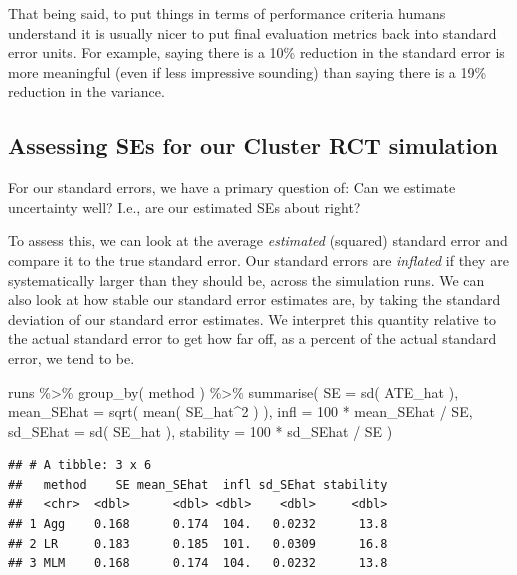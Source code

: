 \documentclass[
]{book}
\newenvironment{Shaded}{\begin{snugshade}}{\end{snugshade}}
\newcommand{\AttributeTok}[1]{\textcolor[rgb]{0.77,0.63,0.00}{#1}}
\newcommand{\DecValTok}[1]{\textcolor[rgb]{0.00,0.00,0.81}{#1}}
\newcommand{\FunctionTok}[1]{\textcolor[rgb]{0.00,0.00,0.00}{#1}}
\newcommand{\NormalTok}[1]{#1}
\newcommand{\SpecialCharTok}[1]{\textcolor[rgb]{0.00,0.00,0.00}{#1}}
\begin{document}
That being said, to put things in terms of performance criteria humans understand it is usually nicer to put final evaluation metrics back into standard error units.
For example, saying there is a 10\% reduction in the standard error is more meaningful (even if less impressive sounding) than saying there is a 19\% reduction in the variance.

\hypertarget{assessing-ses-for-our-cluster-rct-simulation}{%
\subsection{Assessing SEs for our Cluster RCT simulation}\label{assessing-ses-for-our-cluster-rct-simulation}}

For our standard errors, we have a primary question of: Can we estimate uncertainty well? I.e., are our estimated SEs about right?

To assess this, we can look at the average \emph{estimated} (squared) standard error and compare it to the true standard error.
Our standard errors are \emph{inflated} if they are systematically larger than they should be, across the simulation runs.
We can also look at how stable our standard error estimates are, by taking the standard deviation of our standard error estimates.
We interpret this quantity relative to the actual standard error to get how far off, as a percent of the actual standard error, we tend to be.

\begin{Shaded}
\begin{Highlighting}[]
\NormalTok{runs }\SpecialCharTok{\%\textgreater{}\%}  \FunctionTok{group\_by}\NormalTok{( method ) }\SpecialCharTok{\%\textgreater{}\%}
  \FunctionTok{summarise}\NormalTok{( }
    \AttributeTok{SE =} \FunctionTok{sd}\NormalTok{( ATE\_hat ),}
    \AttributeTok{mean\_SEhat =} \FunctionTok{sqrt}\NormalTok{( }\FunctionTok{mean}\NormalTok{( SE\_hat}\SpecialCharTok{\^{}}\DecValTok{2}\NormalTok{ ) ),}
    \AttributeTok{infl =} \DecValTok{100} \SpecialCharTok{*}\NormalTok{ mean\_SEhat }\SpecialCharTok{/}\NormalTok{ SE,}
    \AttributeTok{sd\_SEhat =} \FunctionTok{sd}\NormalTok{( SE\_hat ),}
    \AttributeTok{stability =} \DecValTok{100} \SpecialCharTok{*}\NormalTok{ sd\_SEhat }\SpecialCharTok{/}\NormalTok{ SE )}
\end{Highlighting}
\end{Shaded}

\begin{verbatim}
## # A tibble: 3 x 6
##   method    SE mean_SEhat  infl sd_SEhat stability
##   <chr>  <dbl>      <dbl> <dbl>    <dbl>     <dbl>
## 1 Agg    0.168      0.174  104.   0.0232      13.8
## 2 LR     0.183      0.185  101.   0.0309      16.8
## 3 MLM    0.168      0.174  104.   0.0232      13.8
\end{verbatim}
\end{document}
